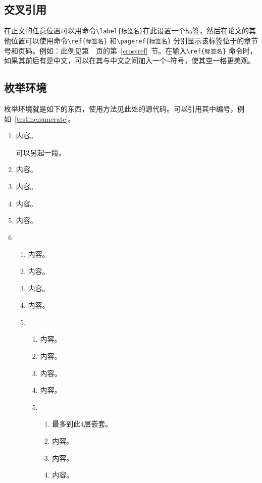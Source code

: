 \subsection{交叉引用}
在正文的任意位置可以用命令\verb|\label{标签名}|\label{crossref}在此设置一个标签，然后在论文的其他位置可以使用命令\verb|\ref{标签名}| 和\verb|\pageref{标签名}| 分别显示该标签位于的章节号和页码。例如：此例见第~\pageref{crossref}~页的第~\ref{crossref}~节。在输入\verb|\ref{标签名}| 命令时，如果其前后有是中文，可以在其与中文之间加入一个\verb|~|符号，使其空一格更美观。

\subsection{枚举环境}
枚举环境就是如下的东西，使用方法见此处的源代码。可以引用其中编号，例如~\ref{testinenumerate}。
\begin{enumerate}
\item 内容。

可以另起一段。
\item 内容。
\item 内容。
\item 内容。
\item 内容。
\item
    \begin{enumerate}
    \item 内容。
    \item 内容。
    \item 内容。
    \item 内容。
    \item
        \begin{enumerate}
        \item 内容。
        \item 内容。
        \item 内容。
        \item 内容。
        \item
            \begin{enumerate}
            \item 最多到此4层嵌套。
            \item 内容。
            \item 内容。
            \item 内容\label{testinenumerate}。
            \end{enumerate}
        \end{enumerate}
    \end{enumerate}
\end{enumerate}
